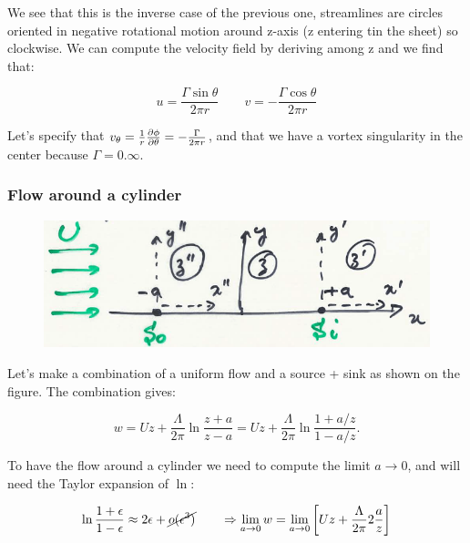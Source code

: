  		We see that this is the inverse case of the previous one, streamlines are circles oriented in negative rotational motion around z-axis (z entering tin the sheet) so clockwise. We can compute the velocity field by deriving among z and we find that: 
 		
 		\begin{equation}
 		u = \frac{\Gamma \sin \theta}{2 \pi r} \qquad v = -\frac{\Gamma \cos \theta}{2\pi r}
 		\end{equation}
 		
 		Let's specify that $v_\theta = \frac{1}{r} \frac{\partial \phi}{\partial \theta} = -\frac{\Gamma}{2 \pi r}$, and that we have a vortex singularity in the center because $\Gamma = 0. \infty$.
 		
 	\subsubsection{Flow around a cylinder}
 		\begin{figure}
		\vspace{-5mm}
		\includegraphics[scale=0.23]{ch2/27}
		\end{figure}
		Let's make a combination of a uniform flow and a source + sink as shown on the figure. The combination gives:
		
		\begin{equation}
		w = Uz + \frac{\Lambda}{2\pi} \ln \frac{z+a}{z-a}= Uz + \frac{\Lambda}{2\pi} \ln \frac{1+a/z}{1-a/z}.
		\end{equation}
		
		To have the flow around a cylinder we need to compute the limit $a\rightarrow 0$, and will need the Taylor expansion of $\ln$:
		
		\begin{equation}
		\ln \frac{1+\epsilon}{1-\epsilon} \approx 2 \epsilon + \cancel{o(\epsilon ^3)} \qquad \Rightarrow \lim _{a\rightarrow 0} w = \lim _{a \rightarrow 0} \left[ Uz + \frac{\Lambda}{2\pi} 2 \frac{a}{z} \right]
		\end{equation}
		

